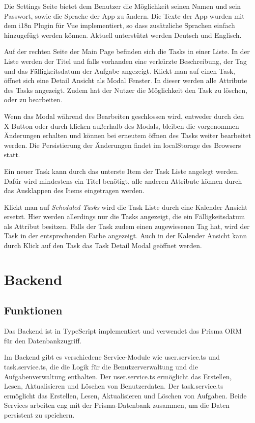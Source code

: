 \documentclass[a4paper, 12pt]{article}
\begin{document}
    Die Settings Seite bietet dem Benutzer die Möglichkeit seinen Namen und sein Passwort, sowie die Sprache der App zu
    ändern. Die Texte der App wurden mit dem i18n Plugin für Vue implementiert, so dass zusätzliche Sprachen einfach
    hinzugefügt werden können. Aktuell unterstützt werden Deutsch und Englisch.

    Auf der rechten Seite der Main Page befinden sich die Tasks in einer Liste. In der Liste werden der Titel und falls
    vorhanden eine verkürzte Beschreibung, der Tag und das Fälligkeitsdatum der Aufgabe angezeigt. Klickt man auf einen
    Task, öffnet sich eine Detail Ansicht als Modal Fenster. In dieser werden alle Attribute des Tasks angezeigt. Zudem
    hat der Nutzer die Möglichkeit den Task zu löschen, oder zu bearbeiten.

    Wenn das Modal während des Bearbeiten geschlossen wird, entweder durch den X-Button oder durch klicken außerhalb des
    Modals, bleiben die vorgenommen Änderungen erhalten und können bei erneutem öffnen des Tasks weiter bearbeitet
    werden. Die Persistierung der Änderungen findet im localStorage des Browsers statt.

    Ein neuer Task kann durch das unterste Item der Task Liste angelegt werden. Dafür wird mindestens ein Titel
    benötigt, alle anderen Attribute können durch das Ausklappen des Items eingetragen werden.

    Klickt man auf {\it Scheduled Tasks} wird die Task Liste durch eine Kalender Ansicht ersetzt. Hier werden allerdings
    nur die Tasks angezeigt, die ein Fälligkeitsdatum als Attribut besitzen. Falls der Task zudem einen zugewiesenen Tag
    hat, wird der Task in der entsprechenden Farbe angezeigt. Auch in der Kalender Ansicht kann durch Klick auf den Task
    das Task Detail Modal geöffnet werden.


    \section{Backend}
    \subsection{Funktionen}

    Das Backend ist in TypeScript implementiert und verwendet das Prisma ORM für den Datenbankzugriff.

    Im Backend gibt es verschiedene Service-Module wie user.service.ts und task.service.ts, die die Logik für die
    Benutzerverwaltung und die Aufgabenverwaltung enthalten. Der user.service.ts ermöglicht das Erstellen, Lesen,
    Aktualisieren und Löschen von Benutzerdaten. Der task.service.ts ermöglicht das Erstellen, Lesen, Aktualisieren und
    Löschen von Aufgaben. Beide Services arbeiten eng mit der Prisma-Datenbank zusammen, um die Daten persistent zu
    speichern.
\end{document}

